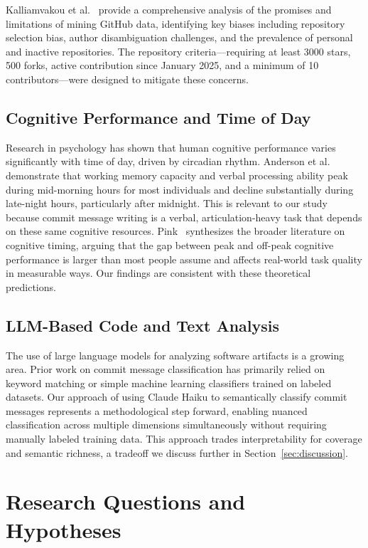 \documentclass[sigconf]{acmart}
\begin{document}
Kalliamvakou et al.~\cite{kalliamvakou2014} provide a comprehensive analysis of the promises and limitations of mining GitHub data, identifying key biases including repository selection bias, author disambiguation challenges, and the prevalence of personal and inactive repositories. The repository criteria---requiring at least 3000 stars, 500 forks, active contribution since January 2025, and a minimum of 10 contributors---were designed to mitigate these concerns.

\subsection{Cognitive Performance and Time of Day}

Research in psychology has shown that human cognitive performance varies significantly with time of day, driven by circadian rhythm. Anderson et al.~\cite{anderson2014} demonstrate that working memory capacity and verbal processing ability peak during mid-morning hours for most individuals and decline substantially during late-night hours, particularly after midnight. This is relevant to our study because commit message writing is a verbal, articulation-heavy task that depends on these same cognitive resources. Pink~\cite{pink2018} synthesizes the broader literature on cognitive timing, arguing that the gap between peak and off-peak cognitive performance is larger than most people assume and affects real-world task quality in measurable ways. Our findings are consistent with these theoretical predictions.

\subsection{LLM-Based Code and Text Analysis}

The use of large language models for analyzing software artifacts is a growing area. Prior work on commit message classification has primarily relied on keyword matching or simple machine learning classifiers trained on labeled datasets. Our approach of using Claude Haiku to semantically classify commit messages represents a methodological step forward, enabling nuanced classification across multiple dimensions simultaneously without requiring manually labeled training data. This approach trades interpretability for coverage and semantic richness, a tradeoff we discuss further in Section~\ref{sec:discussion}.

\section{Research Questions and Hypotheses}
\end{document}
